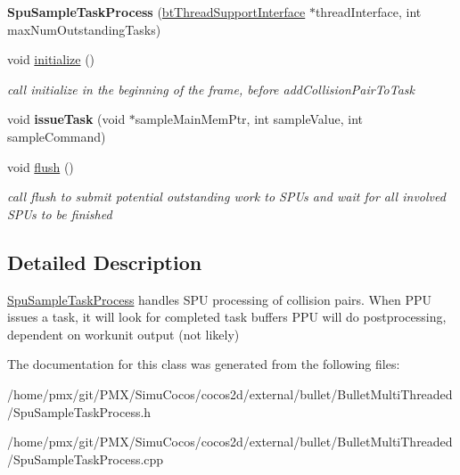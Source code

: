 \begin{DoxyCompactItemize}
{\bfseries Spu\+Sample\+Task\+Process} (\hyperlink{classbtThreadSupportInterface}{bt\+Thread\+Support\+Interface} $\ast$thread\+Interface, int max\+Num\+Outstanding\+Tasks)
\item 
\mbox{\label{classSpuSampleTaskProcess_a955dfb43d04179a0caef12dd9d339ebb}} 
void \hyperlink{classSpuSampleTaskProcess_a955dfb43d04179a0caef12dd9d339ebb}{initialize} ()
\begin{DoxyCompactList}\small\item\em call initialize in the beginning of the frame, before add\+Collision\+Pair\+To\+Task \end{DoxyCompactList}\item 
\mbox{\label{classSpuSampleTaskProcess_a2f9d210a42b8bd17d5a118c36fa57a38}} 
void {\bfseries issue\+Task} (void $\ast$sample\+Main\+Mem\+Ptr, int sample\+Value, int sample\+Command)
\item 
\mbox{\label{classSpuSampleTaskProcess_ad9804e89ae7a0a54c0d43bebd13f3cb9}} 
void \hyperlink{classSpuSampleTaskProcess_ad9804e89ae7a0a54c0d43bebd13f3cb9}{flush} ()
\begin{DoxyCompactList}\small\item\em call flush to submit potential outstanding work to S\+P\+Us and wait for all involved S\+P\+Us to be finished \end{DoxyCompactList}\end{DoxyCompactItemize}


\subsection{Detailed Description}
\hyperlink{classSpuSampleTaskProcess}{Spu\+Sample\+Task\+Process} handles S\+PU processing of collision pairs. When P\+PU issues a task, it will look for completed task buffers P\+PU will do postprocessing, dependent on workunit output (not likely) 

The documentation for this class was generated from the following files\+:\begin{DoxyCompactItemize}
\item 
/home/pmx/git/\+P\+M\+X/\+Simu\+Cocos/cocos2d/external/bullet/\+Bullet\+Multi\+Threaded/Spu\+Sample\+Task\+Process.\+h\item 
/home/pmx/git/\+P\+M\+X/\+Simu\+Cocos/cocos2d/external/bullet/\+Bullet\+Multi\+Threaded/Spu\+Sample\+Task\+Process.\+cpp\end{DoxyCompactItemize}
